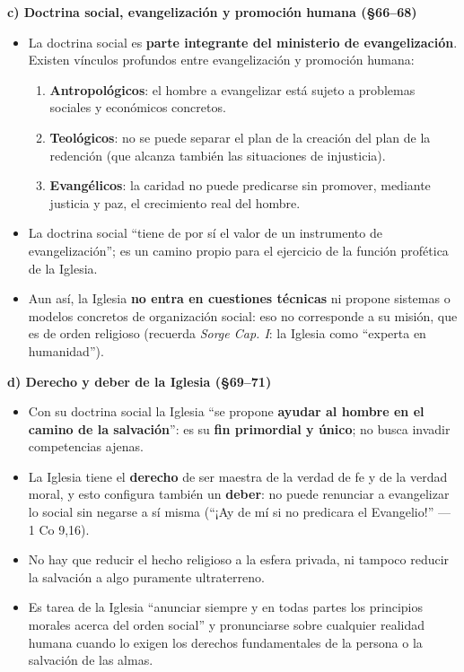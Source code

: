 \documentclass[10pt,a4paper]{article}
\begin{document}
\medskip\noindent \textbf{c) Doctrina social, evangelización y promoción humana (\S{}66--68)}\par\nopagebreak
\begin{itemize}
\item La doctrina social es \textbf{parte integrante del ministerio de evangelización}. Existen vínculos profundos entre evangelización y promoción humana:
\begin{enumerate}
\item \textbf{Antropológicos}: el hombre a evangelizar está sujeto a problemas sociales y económicos concretos.
\item \textbf{Teológicos}: no se puede separar el plan de la creación del plan de la redención (que alcanza también las situaciones de injusticia).
\item \textbf{Evangélicos}: la caridad no puede predicarse sin promover, mediante justicia y paz, el crecimiento real del hombre.
\end{enumerate}
\item La doctrina social ``tiene de por sí el valor de un instrumento de evangelización''; es un camino propio para el ejercicio de la función profética de la Iglesia.
\item Aun así, la Iglesia \textbf{no entra en cuestiones técnicas} ni propone sistemas o modelos concretos de organización social: eso no corresponde a su misión, que es de orden religioso (recuerda \textit{Sorge Cap. I}: la Iglesia como ``experta en humanidad'').
\end{itemize}

\medskip\noindent \textbf{d) Derecho y deber de la Iglesia (\S{}69--71)}\par\nopagebreak
\begin{itemize}
\item Con su doctrina social la Iglesia ``se propone \textbf{ayudar al hombre en el camino de la salvación}'': es su \textbf{fin primordial y único}; no busca invadir competencias ajenas.
\item La Iglesia tiene el \textbf{derecho} de ser maestra de la verdad de fe y de la verdad moral, y esto configura también un \textbf{deber}: no puede renunciar a evangelizar lo social sin negarse a sí misma (``¡Ay de mí si no predicara el Evangelio!'' --- 1 Co 9,16).
\item No hay que reducir el hecho religioso a la esfera privada, ni tampoco reducir la salvación a algo puramente ultraterreno.
\item Es tarea de la Iglesia ``anunciar siempre y en todas partes los principios morales acerca del orden social'' y pronunciarse sobre cualquier realidad humana cuando lo exigen los derechos fundamentales de la persona o la salvación de las almas.
\end{itemize}
\end{document}
